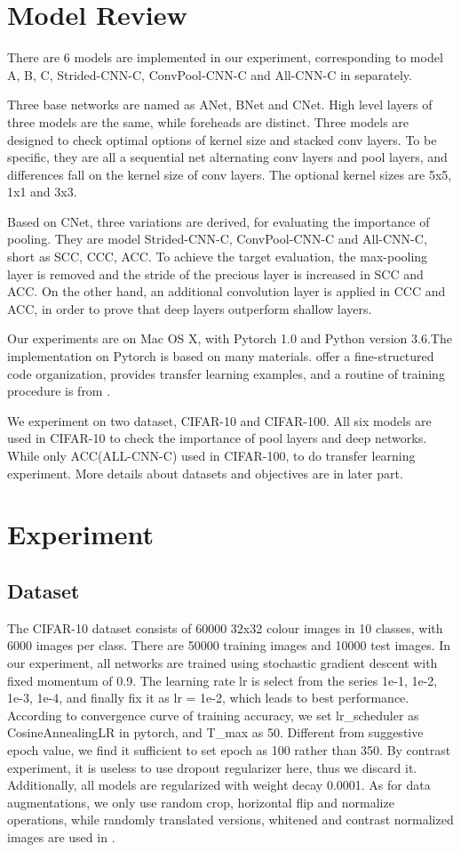 \documentclass[10pt,twocolumn,letterpaper]{article}
\begin{document}
\section{Model Review}
There are 6 models are implemented in our experiment, corresponding to model A, B, C, Strided-CNN-C, ConvPool-CNN-C and All-CNN-C in \cite{striving} separately.

Three base networks are named as ANet, BNet and CNet. High level layers of three models are the same, while foreheads are distinct. Three models are designed to check optimal options of kernel size and stacked conv layers. To be specific, they are all a sequential net alternating conv layers and pool layers, and differences fall on the kernel size of conv layers. The optional kernel sizes are 5x5, 1x1 and 3x3.

Based on CNet, three variations are derived, for evaluating the importance of pooling. They are model Strided-CNN-C, ConvPool-CNN-C and All-CNN-C,  short as SCC, CCC, ACC. To achieve the target evaluation, the max-pooling layer is removed and the stride of the precious layer is increased in SCC and ACC. On the other hand, an additional convolution layer is applied in CCC and ACC, in order to prove that deep layers outperform shallow layers.

Our experiments are on Mac OS X, with Pytorch 1.0 and Python version 3.6.The implementation on Pytorch is based on many materials. \cite{style} offer a fine-structured code organization, \cite{torch} provides transfer learning examples, and a routine of training procedure is from \cite{acc}.

We experiment on two dataset, CIFAR-10 and CIFAR-100. All six models are used in CIFAR-10 to check the importance of pool layers and deep networks. While only ACC(ALL-CNN-C) used in CIFAR-100, to do transfer learning experiment. More details about datasets and objectives are in later part.

\section{Experiment}
    \subsection{Dataset}
    The CIFAR-10 dataset consists of 60000 32x32 colour images in 10 classes, with 6000 images per class. There are 50000 training images and 10000 test images. In our experiment, all networks are trained using stochastic gradient descent with fixed momentum of 0.9. The learning rate lr is select from the series {1e-1, 1e-2, 1e-3, 1e-4}, and finally fix it as lr = 1e-2, which leads to best performance. According to convergence curve of training accuracy, we set lr\_scheduler as CosineAnnealingLR in pytorch, and T\_max as 50. Different from suggestive epoch value, we find it sufficient to set epoch as 100 rather than 350. By contrast experiment, it is useless to use dropout regularizer here, thus we discard it. Additionally, all models are regularized with weight decay 0.0001. As for data augmentations, we only use random crop, horizontal flip and normalize operations, while randomly translated versions, whitened and contrast normalized images are used in \cite{striving}. 
    
\end{document}
